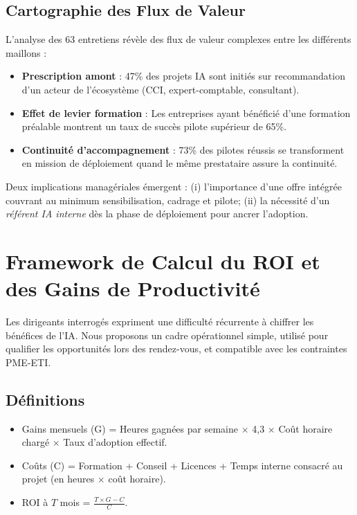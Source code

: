 \subsection{Cartographie des Flux de Valeur}

L'analyse des 63 entretiens révèle des flux de valeur complexes entre les différents maillons :

\begin{itemize}
    \item \textbf{Prescription amont} : 47\% des projets IA sont initiés sur recommandation d'un acteur de l'écosystème (CCI, expert-comptable, consultant).
    \item \textbf{Effet de levier formation} : Les entreprises ayant bénéficié d'une formation préalable montrent un taux de succès pilote supérieur de 65\%.
    \item \textbf{Continuité d'accompagnement} : 73\% des pilotes réussis se transforment en mission de déploiement quand le même prestataire assure la continuité.
\end{itemize}

Deux implications managériales émergent : (i) l'importance d'une offre intégrée couvrant au minimum sensibilisation, cadrage et pilote; (ii) la nécessité d'un \emph{référent IA interne} dès la phase de déploiement pour ancrer l'adoption.

\section{Framework de Calcul du ROI et des Gains de Productivité}
\label{sec:roi_framework}
Les dirigeants interrogés expriment une difficulté récurrente à chiffrer les bénéfices de l'IA. Nous proposons un cadre opérationnel simple, utilisé pour qualifier les opportunités lors des rendez-vous, et compatible avec les contraintes PME-ETI.

\subsection{Définitions}
\begin{itemize}
    \item Gains mensuels (G) = Heures gagnées par semaine $\times$ 4{,}3 $\times$ Coût horaire chargé $\times$ Taux d'adoption effectif.
    \item Coûts (C) = Formation + Conseil + Licences + Temps interne consacré au projet (en heures $\times$ coût horaire).
    \item ROI à $T$ mois = $\frac{T \times G - C}{C}$.
\end{itemize}

